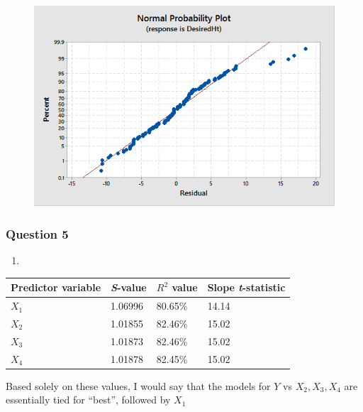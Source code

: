 \documentclass{article}
\begin{document}
\begin{enumerate}
\begin{figure}[h!]
 \centering
 \includegraphics[scale=.5]{./images/probability-plot-residuals_height-vs-desiredHeight.png}
\end{figure}

\end{enumerate}

    \subsubsection{Question 5}\label{question-5}

\begin{enumerate}
\def\labelenumi{\alph{enumi})}
\item
\end{enumerate}

\begin{longtable}[c]{@{}llll@{}}
\toprule
Predictor variable & \emph{S}-value & \(R^2\) value & Slope
\emph{t}-statistic\tabularnewline
\midrule
\endhead
\(X_1\) & 1.06996 & 80.65\% & 14.14\tabularnewline
\(X_2\) & 1.01855 & 82.46\% & 15.02\tabularnewline
\(X_3\) & 1.01873 & 82.46\% & 15.02\tabularnewline
\(X_4\) & 1.01878 & 82.45\% & 15.02\tabularnewline
\bottomrule
\end{longtable}

Based solely on these values, I would say that the models for \(Y\) vs
\(X_2, X_3, X_4\) are essentially tied for ``best'', followed by \(X_1\)
\end{document}
